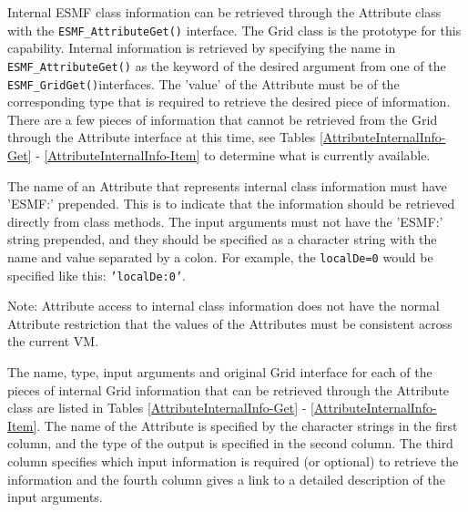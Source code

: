 
\label{sec:InternalInfo}

Internal ESMF class information can be retrieved through the Attribute 
class with the {\tt ESMF\_AttributeGet()} interface.  The Grid class is
the prototype for this capability.  Internal information is retrieved by 
specifying the name in {\tt ESMF\_AttributeGet()} as the keyword of the 
desired argument from one of the {\tt ESMF\_GridGet()}interfaces.  
The 'value' of the Attribute must be of the corresponding type
that is required to retrieve the desired piece of information.  There are 
a few pieces of information that cannot be retrieved from the Grid
through the Attribute interface at this time, see Tables 
\ref{AttributeInternalInfo-Get} - \ref{AttributeInternalInfo-Item} to
determine what is currently available.

The name of an Attribute that represents internal class information must have 
'ESMF:' prepended.  This is to indicate that the information should be retrieved
directly from class methods.  The input arguments must not have the 'ESMF:'
string prepended, and they should be specified as a character string with the name
and value separated by a colon.  For example, the {\tt localDe=0} would be specified 
like this: {\tt 'localDe:0'}.

Note: Attribute access to internal class information does not
have the normal Attribute restriction that the values of the Attributes must be
consistent across the current VM.

The name, type, input arguments and original Grid interface for each of the 
pieces of internal Grid information that can be retrieved through the Attribute 
class are listed in Tables \ref{AttributeInternalInfo-Get} - 
\ref{AttributeInternalInfo-Item}.
The name of the Attribute is specified by the character strings in the first 
column, and the type of the output is specified in the second column.
The third column specifies which input information is required (or optional) 
to retrieve the information and the fourth column gives a link to a detailed
description of the input arguments.

